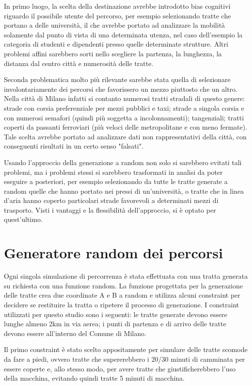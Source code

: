 In primo luogo, la scelta della destinazione avrebbe introdotto bias cognitivi riguardo il possibile utente del percorso, per esempio selezionando tratte che portano a delle università, il che avrebbe portato ad analizzare la mobilità solamente dal punto di vista di una determinata utenza, nel caso dell'esempio la categoria di studenti e dipendenti presso quelle determinate strutture. Altri problemi affini sarebbero sorti nello scegliere la partenza, la lunghezza, la distanza dal centro città e numerosità delle tratte.

Seconda problematica molto più rilevante sarebbe stata quella di selezionare involontariamente dei percorsi che favorissero un mezzo piuttosto che un altro. Nella città di Milano infatti si contanto numerosi tratti stradali di questo genere: strade con corsia preferenziale per mezzi pubblici e taxi; strade a singola corsia e con numerosi semafori (quindi più soggetta a incolonnamenti); tangenziali; tratti coperti da passanti ferroviari (più veloci delle metropolitane e con meno fermate). Tale scelta avrebbe portato ad analizzare dati non rappresentativi della città, con conseguenti risultati in un certo senso "falsati".

Usando l'approccio della generazione a random non solo si sarebbero evitati tali problemi, ma i problemi stessi si sarebbero trasformati in analisi da poter eseguire a posteriori, per esempio selezionando da tutte le tratte generate a random quelle che hanno portato nei pressi di un'università, o tratte che in linea d'aria hanno coperto particolari strade favorevoli a determinati mezzi di trasporto. Visti i vantaggi e la flessibilità dell'approccio, si è optato per quest'ultimo.

\section{Generatore random dei percorsi}

Ogni singola simulazione di percorrenza è stata effettuata con una tratta generata su richiesta con una funzione random. La funzione progettata per la generazione delle tratte crea due coordinate A e B a random e utilizza alcuni constraint per decidere se restituire la tratta o ripetere il processo di generazione. I constraint utilizzati per questo studio sono i seguenti: le tratte generate devono essere lunghe almeno 2km in via aerea; i punti di partenza e di arrivo delle tratte devono essere all'interno del Comune di Milano.

Il primo constraint è stato scelto appositamente per simulare delle tratte scomode da fare a piedi, ovvero tratte che supererebbero i 20/30 minuti di camminata per essere coperte e, allo stesso modo, per avere tratte che giustificherebbero l'uso della macchina, evitando quindi tratte 5 minuti di macchina.

